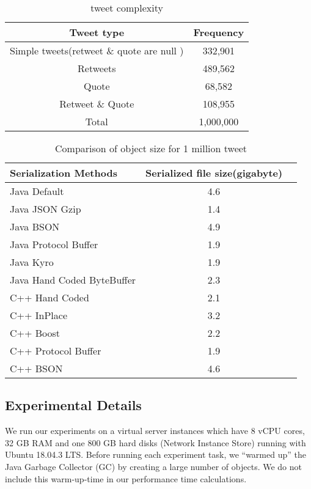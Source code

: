 \begin{table}
	\centering
	\caption{tweet complexity }
	\label{tbl:object_size}
	\begin{adjustbox}{width=\columnwidth,center}	
		
		\begin{tabular}{|c|c|} \hline
			Tweet type & Frequency\\ \hline
			Simple tweets(retweet \& quote are null ) & 332,901\\ \hline
			Retweets & 489,562\\ \hline
			Quote & 68,582\\ \hline
			Retweet \& Quote & 108,955\\ \hline
			Total & 1,000,000 \\ \hline
			
			\hline\end{tabular}
	\end{adjustbox}
\end{table}

\begin{table}
	\centering
	\caption{Comparison of object size for 1 million tweet }
	\label{tbl:object_size}
	\begin{adjustbox}{width=\columnwidth,center}	
		
		\begin{tabular}{|l|c|c|} \hline
		 \textbf{Serialization Methods} & \textbf{Serialized file size(gigabyte)}\\ \hline
			Java Default  & 4.6 \\ \hline	
			Java JSON Gzip  & 1.4 \\ \hline	
			Java BSON  & 4.9 \\ \hline	
			Java Protocol Buffer  & 1.9 \\ \hline	
			Java Kyro  & 1.9 \\ \hline	
			Java Hand Coded ByteBuffer  & 2.3 \\ \hline	
			C++ Hand Coded  & 2.1 \\ \hline	
			C++ InPlace  & 3.2 \\ \hline	
			C++ Boost  & 2.2 \\ \hline	
			C++ Protocol Buffer  & 1.9 \\ \hline
			C++ BSON  & 4.6 \\ \hline					
			\hline\end{tabular}
	\end{adjustbox}
\end{table}


\subsection{Experimental Details}
We run our experiments on a virtual server instances which have 8 vCPU cores, 32 GB RAM and one 800
GB hard disks (Network Instance Store) running with Ubuntu 18.04.3 LTS. Before running each experiment task, we “warmed up” the Java Garbage Collector (GC) by creating a large number of objects. We do not include this warm-up-time in our performance time calculations.

